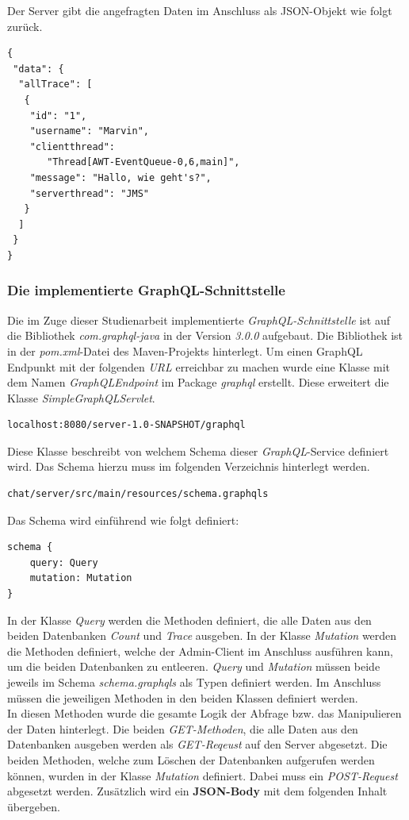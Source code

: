 \documentclass[10pt,journal,compsoc]{IEEEtran}
\begin{document}
Der Server gibt die angefragten Daten im Anschluss als JSON-Objekt wie folgt zurück. 
\begin{lstlisting}
{
 "data": {
  "allTrace": [
   {
    "id": "1",
    "username": "Marvin",
    "clientthread": 
       "Thread[AWT-EventQueue-0,6,main]",
    "message": "Hallo, wie geht's?",
    "serverthread": "JMS"
   }
  ]
 }
}
\end{lstlisting}
\subsubsection{Die implementierte GraphQL-Schnittstelle}
Die im Zuge dieser Studienarbeit implementierte \textit{GraphQL-Schnittstelle} ist auf die  Bibliothek \textit{com.graphql-java} in der Version \textit{3.0.0} aufgebaut. Die Bibliothek ist in der \textit{pom.xml}-Datei des Maven-Projekts hinterlegt. Um einen GraphQL Endpunkt mit der folgenden \textit{URL} erreichbar zu machen wurde eine Klasse mit dem Namen \textit{GraphQLEndpoint} im Package \textit{graphql} erstellt. Diese erweitert die Klasse \textit{SimpleGraphQLServlet}.
\begin{lstlisting}
localhost:8080/server-1.0-SNAPSHOT/graphql
\end{lstlisting}
Diese Klasse beschreibt von welchem Schema dieser \textit{GraphQL}-Service definiert wird. Das Schema hierzu muss im folgenden Verzeichnis hinterlegt werden. 
\begin{lstlisting}
chat/server/src/main/resources/schema.graphqls
\end{lstlisting}
Das Schema wird einführend wie folgt definiert:
\begin{lstlisting}
schema {
	query: Query
	mutation: Mutation
}
\end{lstlisting}
In der Klasse \textit{Query} werden die Methoden definiert, die alle Daten aus den beiden Datenbanken \textit{Count} und \textit{Trace} ausgeben. In der Klasse \textit{Mutation} werden die Methoden definiert, welche der Admin-Client im Anschluss ausführen kann, um die beiden Datenbanken zu entleeren. \textit{Query} und \textit{Mutation} müssen beide jeweils im Schema \textit{schema.graphqls} als Typen definiert werden. Im Anschluss müssen die jeweiligen Methoden in den beiden Klassen definiert werden. \\
In diesen Methoden wurde die gesamte Logik der Abfrage bzw. das Manipulieren der Daten hinterlegt. Die beiden \textit{GET-Methoden}, die alle Daten aus den Datenbanken ausgeben werden als \textit{GET-Reqeust} auf den Server abgesetzt. Die beiden Methoden, welche zum Löschen der Datenbanken aufgerufen werden können, wurden in der Klasse \textit{Mutation} definiert. Dabei muss ein \textit{POST-Request} abgesetzt werden. Zusätzlich wird ein \textbf{JSON-Body} mit dem folgenden Inhalt übergeben.
\end{document}
